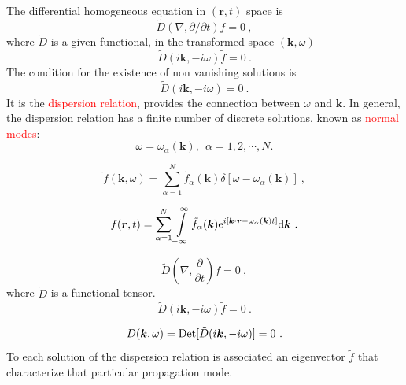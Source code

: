 \documentclass[12pt,a4paper]{article}
\renewcommand{\vec}[1]{\boldsymbol{#1}}
\newcommand{\dif}{\mathrm{d}}
\begin{document}
The differential homogeneous equation in $(\vec{r},t)$ space is 
\begin{equation}
\tilde{D}(\nabla, \partial/\partial t) f = 0 ~,
\end{equation}
where $\tilde{D}$ is a given functional, in the transformed space $(\vec{k}, \omega)$
\begin{equation}
\tilde{D}(i\vec{k}, -i\omega) \tilde{f} = 0 ~.
\end{equation}
The condition for the existence of non vanishing solutions is
\begin{equation*}
\tilde{D}(i\vec{k}, -i\omega) = 0 ~.
\end{equation*}
It is the \textcolor{red}{dispersion relation}, provides the connection between $\omega$ and $\vec{k}$. In general, the dispersion relation has a finite number of discrete solutions, known as \textcolor{red}{normal modes}:
\begin{equation}
\omega = \omega_\alpha (\vec{k}), ~~\alpha = 1, 2, \cdots, N.
\end{equation}

\begin{equation}
\tilde{f}(\vec{k}, \omega) = \sum_{\alpha=1}^N \tilde{f}_\alpha(\vec{k}) \delta[\omega -\omega_\alpha(\vec{k})] ~,
\end{equation}

\begin{equation}
f(\vec{r}, t) = \sum_{\alpha=1}^N \int\limits_{-\infty}^{\infty} \tilde{f}_\alpha(\vec{k}) {\rm e}^{i[\vec{k}\cdot \vec{r} -\omega_\alpha(\vec{k}) t]} \dif \vec{k} ~.
\end{equation}

\begin{equation*}
\tilde{D}\left(\nabla, \frac{\partial}{\partial t} \right) f = 0 ~,
\end{equation*}
where $\tilde{D}$ is a functional tensor.
\begin{equation}
\tilde{D}(i\vec{k}, -i\omega) \tilde{f} = 0 ~.
\end{equation}

\begin{equation}
D(\vec{k}, \omega) = {\rm Det} [\tilde{D}(i\vec{k}, -i\omega) ] = 0 ~.
\end{equation}
To each solution of the dispersion relation is associated an eigenvector $\tilde{f}$ that characterize that particular propagation mode.
\end{document}
